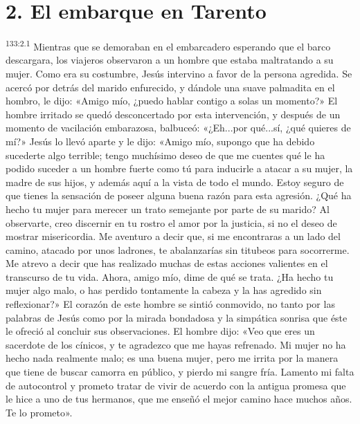 \section*{2. El embarque en Tarento}
\par 
\textsuperscript{133:2.1} Mientras que se demoraban en el embarcadero esperando que el barco descargara, los viajeros observaron a un hombre que estaba maltratando a su mujer. Como era su costumbre, Jesús intervino a favor de la persona agredida. Se acercó por detrás del marido enfurecido, y dándole una suave palmadita en el hombro, le dijo: «Amigo mío, ¿puedo hablar contigo a solas un momento?» El hombre irritado se quedó desconcertado por esta intervención, y después de un momento de vacilación embarazosa, balbuceó: «¿Eh...por qué...sí, ¿qué quieres de mí?» Jesús lo llevó aparte y le dijo: «Amigo mío, supongo que ha debido sucederte algo terrible; tengo muchísimo deseo de que me cuentes qué le ha podido suceder a un hombre fuerte como tú para inducirle a atacar a su mujer, la madre de sus hijos, y además aquí a la vista de todo el mundo. Estoy seguro de que tienes la sensación de poseer alguna buena razón para esta agresión. ¿Qué ha hecho tu mujer para merecer un trato semejante por parte de su marido? Al observarte, creo discernir en tu rostro el amor por la justicia, si no el deseo de mostrar misericordia. Me aventuro a decir que, si me encontraras a un lado del camino, atacado por unos ladrones, te abalanzarías sin titubeos para socorrerme. Me atrevo a decir que has realizado muchas de estas acciones valientes en el transcurso de tu vida. Ahora, amigo mío, dime de qué se trata. ¿Ha hecho tu mujer algo malo, o has perdido tontamente la cabeza y la has agredido sin reflexionar?» El corazón de este hombre se sintió conmovido, no tanto por las palabras de Jesús como por la mirada bondadosa y la simpática sonrisa que éste le ofreció al concluir sus observaciones. El hombre dijo: «Veo que eres un sacerdote de los cínicos, y te agradezco que me hayas refrenado. Mi mujer no ha hecho nada realmente malo; es una buena mujer, pero me irrita por la manera que tiene de buscar camorra en público, y pierdo mi sangre fría. Lamento mi falta de autocontrol y prometo tratar de vivir de acuerdo con la antigua promesa que le hice a uno de tus hermanos, que me enseñó el mejor camino hace muchos años. Te lo prometo».

